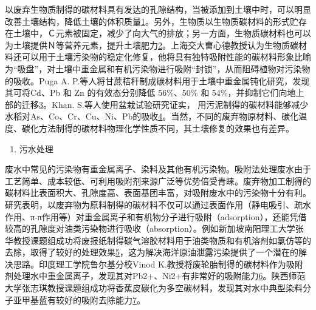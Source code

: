 \documentclass[]{book}
\providecommand{\tightlist}{%
  \setlength{\itemsep}{0pt}\setlength{\parskip}{0pt}}
\begin{document}
以废弃生物质制得的碳材料具有发达的孔隙结构，当被添加到土壤中时，可以明显改善土壤结构，降低土壤的体积质量\href{陈心想，耿增超。西北农林科技大学学报（自然科学版），2013，41:\%20167-174．}{1}。另外，生物质以生物质碳材料的形式贮存在土壤中，Ｃ元素被固定，减少了向大气的排放；另一方面，生物质碳材料也可以为土壤提供Ｎ等营养元素，提升土壤肥力\href{Kezhen\%20Qian,\%20Ajay\%20Kumar,\%20et.al.\%20Renew.\%20and\%20Sustain.\%20Energy\%20Reviews,\%202015,\%2042:\%201055-1064.}{2}。上海交大曹心德教授认为生物质碳材料还可以用于土壤污染物的稳定化修复，他将具有独特吸附性能的碳材料形象比喻为``吸盘''，对土壤中重金属和有机污染物进行吸附``封锁''，从而阻碍植物对污染物的吸收。Puga A. P.等人将甘蔗秸秆制成碳材料用于土壤中重金属钝化研究，发现其可将Cd、Pb 和 Zn 的有效态分别降低 56\%、50\% 和 54\%，并抑制它们向地上部的迁移\href{Puga\%20A\%20P,\%20Abreu\%20C\%20A,\%20et\%20al.\%20J.\%20of\%20Environ.\%20Manage.,\%202015,\%20159:\%2086–93.}{3}。Khan. S.等人使用盆栽试验研究证实， 用污泥制得的碳材料能够减少水稻对As、Co、Cr、Cu、Ni、Pb的吸收\href{Khan\%20S,\%20Cai\%20Chao,\%20et\%20al．\%20Environ.\%20Sci.\%20\&\%20Technol.,\%202013,\%2047\%20:\%208624-8632．}{4}。当然，不同的废弃物原材料、碳化温度、碳化方法制得的碳材料物理化学性质不同，其土壤修复的效果也有差异。

\begin{enumerate}
\def\labelenumi{\arabic{enumi}.}
\setcounter{enumi}{1}
\tightlist
\item
  污水处理
\end{enumerate}

废水中常见的污染物有重金属离子、染料及其他有机污染物。吸附法处理废水由于工艺简单、成本较低、可利用吸附剂来源广泛等优势倍受青睐。废弃物加工制得的碳材料比表面积大、孔隙度高、表面基团丰富，对吸附废水中的污染物十分有利。研究表明，以废弃物为原料制得的碳材料不仅可以通过表面作用（静电吸引、疏水作用、π-π作用等）对重金属离子和有机物分子进行吸附（adsorption），还能凭借较高的孔隙度对油类污染物进行吸收（absorption）。例如新加坡南阳理工大学张华教授课题组成功将废报纸制得碳气溶胶材料用于油类物质和有机溶剂如氯仿等的去除，取得了较好的处理效果\href{Bi\%20H,\%20Huang\%20X,\%20et\%20al.\%20Small\%202014,\%2010,\%203544.}{5}，这为解决海洋原油泄露污染提供了一个潜在的解决思路。印度理工学院鲁尔基分校Vinod K.教授将废轮胎制得的碳材料作为吸附剂处理水中重金属离子，发现其对Pb2+、Ni2+有非常好的吸附能力\href{Gupta\%20V\%20K,\%20Ganjali\%20M\%20R,\%20et\%20al.\%20Chemical\%20Engineering\%20Journal,\%202012,\%20197:\%20330.}{6}。陕西师范大学张志琪教授课题组成功将香蕉皮碳化为多空碳材料，发现其对水中典型染料分子亚甲基蓝有较好的吸附去除能力\href{Liu\%20R\%20L,\%20Liu\%20Y,\%20et\%20al.\%20Bioresourse\%20Technology\%202014,\%20154:\%20138.}{7}。
\end{document}

